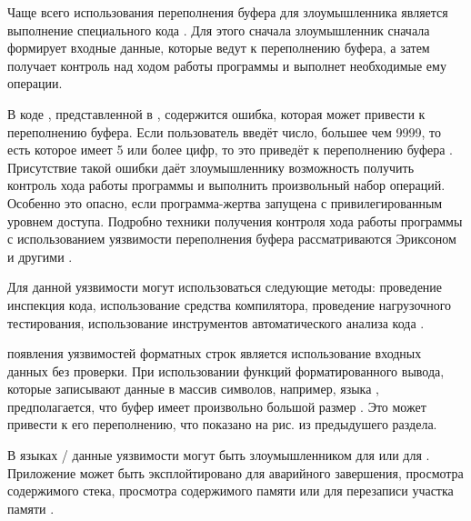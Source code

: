 %
Чаще всего  использования переполнения буфера для злоумышленника является выполнение специального кода . 
%
Для этого сначала злоумышленник сначала формирует входные данные, которые ведут к переполнению буфера, а затем получает контроль над ходом работы программы и выполнет необходимые ему операции. 

%
В коде , представленной в  , содержится ошибка, которая может привести к переполнению буфера.
%
Если пользователь введёт число, большее чем 9999, то есть которое имеет 5 или более цифр, то это приведёт к переполнению буфера .
%
Присутствие такой ошибки даёт злоумышленнику возможность получить контроль хода работы программы и выполнить произвольный набор операций.
%
Особенно это опасно, если программа-жертва запущена с привилегированным уровнем доступа.
%
Подробно техники получения контроля хода работы программы с использованием уязвимости переполнения буфера рассматриваются Эриксоном и другими  .

%
Для  данной уязвимости могут использоваться следующие методы: проведение инспекция кода, использование средства компилятора, проведение нагрузочного тестирования, использование инструментов автоматического анализа кода   .



%
 появления уязвимостей форматных строк является использование входных данных без проверки. 
%
При использовании функций форматированного вывода, которые записывают данные в массив символов, например,  языка , предполагается, что буфер имеет произвольно большой размер . 
%
Это может привести к его переполнению, что показано на рис. из предыдушего раздела.

%
В языках / данные уязвимости могут быть  злоумышленником для  или для  . 
%
Приложение может быть эксплойтировано для аварийного завершения, просмотра содержимого стека, просмотра содержимого памяти или для перезаписи участка памяти   . 

